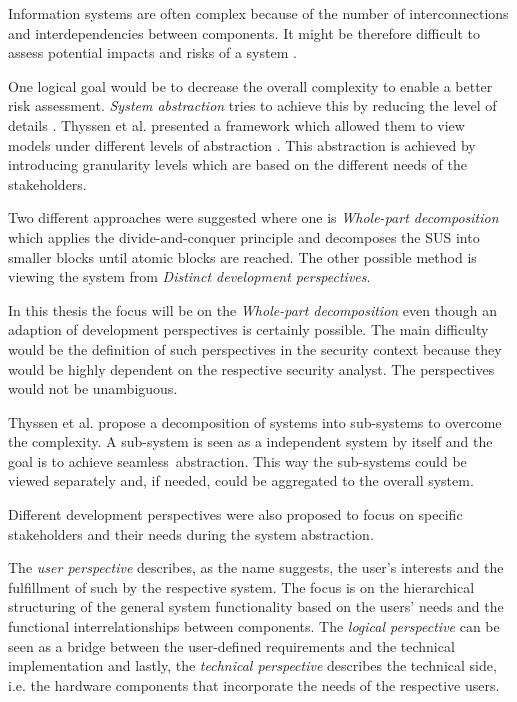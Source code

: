 Information systems are often complex because of the number of interconnections and interdependencies between components. It might be therefore difficult to assess potential impacts and risks of a system \cite{branagan}.

One logical goal would be to decrease the overall complexity to enable a better risk assessment. \textit{System abstraction} tries to achieve this by reducing the level of details \cite{branagan}. Thyssen et al. presented a framework which allowed them to view models under different levels of abstraction \cite{thyssen2010system}. This abstraction is achieved by introducing granularity levels which are based on the different needs of the stakeholders. 

Two different approaches were suggested where one is \textit{Whole-part decomposition} which applies the divide-and-conquer principle and decomposes the SUS into smaller blocks until atomic blocks are reached. The other possible method is viewing the system from \textit{Distinct development perspectives}. 

In this thesis the focus will be on the \textit{Whole-part decomposition} even though an adaption of development perspectives is certainly possible. The main difficulty would be the definition of such perspectives in the security context because they would be highly dependent on the respective security analyst. The perspectives would not be unambiguous.

Thyssen et al. propose a decomposition of systems into sub-systems to overcome the complexity. A sub-system is seen as a independent system by itself and the goal is to achieve \glqq seamless\grqq \ abstraction. This way the sub-systems could be viewed separately and, if needed, could be aggregated to the overall system.

Different development perspectives were also proposed to focus on specific stakeholders and their needs during the system abstraction. 

The \textit{user perspective} describes, as the name suggests, the user's interests and the fulfillment of such by the respective system. The focus is on the hierarchical structuring of the general system functionality based on the users' needs and the functional interrelationships between components. The \textit{logical perspective} can be seen as a bridge between the user-defined requirements and the technical implementation and lastly, the \textit{technical perspective} describes the technical side, i.e. the hardware components that incorporate the needs of the respective users.  

